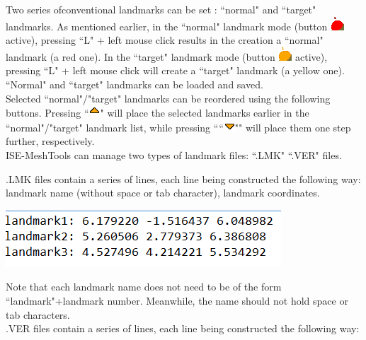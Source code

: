Two series ofconventional landmarks can be set : ``normal" and ``target" landmarks. As mentioned earlier, in the ``normal" landmark mode (button \includegraphics[scale=0.7]{images/pixmap/Landmarks4.png} active), pressing ``L" + left mouse click results in
the creation a ``normal" landmark (a red one). In the ``target" landmark mode (button \includegraphics[scale=0.7]{images/pixmap/Landmarks6.png} active),
pressing ``L" + left mouse click will create a ``target" landmark (a yellow one). ``Normal" and ``target" landmarks can be loaded and saved.\\
Selected ``normal"/"target" landmarks can be reordered using the following buttons. Pressing ``\includegraphics[scale=0.7]{images/pixmap/s_dessous_17.png}"
will place the selected landmarks earlier in the ``normal"/"target" landmark list, while pressing ````\includegraphics[scale=0.7]{images/pixmap/s_dessus_17.png}""
will place them one step further, respectively.\\
ISE-MeshTools can manage two types of landmark files: ``.LMK" ``.VER" files.

\noindent
\begin{minipage}{0.6\textwidth}
.LMK files contain a series of lines, each line
being constructed the following way: landmark
name (without space or tab character),
landmark coordinates.

\end{minipage}  
 \begin{minipage}{0.4\textwidth}\centering
  \includegraphics[scale=0.5]{images/Landmarks/LMK_file.png}
 \end{minipage} 


Note that each landmark name does not need to be of the form ``landmark"+landmark number. Meanwhile, the name should not hold space or tab
characters.
\\
.VER files contain a series
of lines, each line being
constructed the following
way:
\noindent

